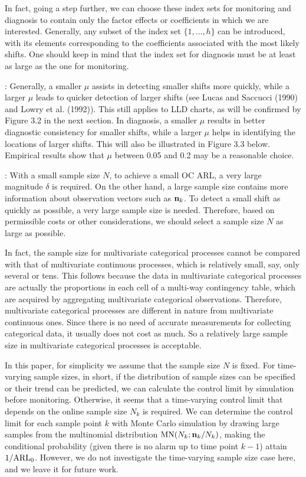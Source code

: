 In fact, going a step further, we can choose these index sets for monitoring and
diagnosis to contain only the factor effects or coefficients in which we are
interested. Generally, any subset of the index set $\{1,\ldots,h\}$ can be
introduced, with its elements corresponding to the coefficients associated with the
most likely shifts. One should keep in mind that the index set for diagnosis must be
at least as large as the one for monitoring.

: Generally, a smaller $\mu$ assists
in detecting smaller shifts more quickly, while a larger $\mu$ leads to quicker
detection of larger shifts (see Lucas and Saccucci (1990) and Lowry et al. (1992)).
This still applies to LLD charts, as will be confirmed by Figure 3.2 in the next
section. In diagnosis, a smaller $\mu$ results in better diagnostic consistency for
smaller shifts, while a larger $\mu$ helps in identifying the locations of larger
shifts. This will also be illustrated in Figure 3.3 below. Empirical results show
that $\mu$ between 0.05 and 0.2 may be a reasonable choice.

: With a small sample size $N$, to achieve a
small OC ARL, a very large magnitude $\delta$ is required. On the other hand, a
large sample size contains more information about observation vectors such as ${\bf
n}_k$. To detect a small shift as quickly as possible, a very large sample size is
needed. Therefore, based on permissible costs or other considerations, we should
select a sample size $N$ as large as possible.

In fact, the sample size for multivariate categorical processes cannot be compared
with that of multivariate continuous processes, which is relatively small, say, only
several or tens. This follows because the data in multivariate categorical processes
are actually the proportions in each cell of a multi-way contingency table, which
are acquired by aggregating multivariate categorical observations. Therefore,
multivariate categorical processes are different in nature from multivariate
continuous ones. Since there is no need of accurate measurements for collecting
categorical data, it usually does not cost as much. So a relatively large sample
size in multivariate categorical processes is acceptable.

In this paper, for simplicity we assume that the sample size $N$ is fixed. For
time-varying sample sizes, in short, if the distribution of sample sizes can be
specified or their trend can be predicted, we can calculate the control limit by
simulation before monitoring. Otherwise, it seems that a time-varying control limit
that depends on the online sample size $N_k$ is required. We can determine the
control limit for each sample point $k$ with Monte Carlo simulation by drawing large
samples from the multinomial distribution $\mbox{MN}(N_k;{\bf n}_k/N_k)$, making the
conditional probability (given there is no alarm up to time point $k-1$) attain
$1/{\rm ARL}_0$. However, we do not investigate the time-varying sample size case
here, and we leave it for future work.

